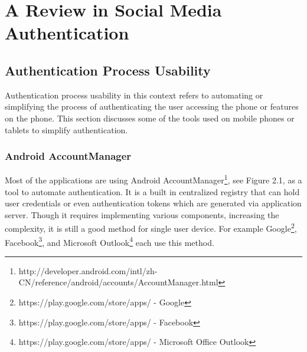 
\chapter{A Review in Social Media Authentication} %

\ifpdf
    \graphicspath{{X/figures/PNG/}{X/figures/PDF/}{X/figures/}}
\else
    \graphicspath{{X/figures/EPS/}{X/figures/}}
\fi



\section{Authentication Process Usability}
Authentication process usability in this context refers to automating or simplifying the process of authenticating the user accessing the phone or features on the phone. This section discusses some of the tools used on mobile phones or tablets to simplify authentication.

\subsection{Android AccountManager}
Most of the applications are using Android AccountManager\footnote[4]{http://developer.android.com/intl/zh-CN/reference/android/accounts/AccountManager.html}, see Figure 2.1, as a tool to automate authentication. It is a built in centralized registry that can hold user credentials or even authentication tokens which are generated via application server. Though it requires implementing various components, increasing the complexity, it is still a good method for single user device. For example Google\footnote[5]{https://play.google.com/store/apps/ - Google}, Facebook\footnote[6]{https://play.google.com/store/apps/ - Facebook}, and Microsoft Outlook\footnote[7]{https://play.google.com/store/apps/ - Microsoft Office Outlook} each use this method. 

